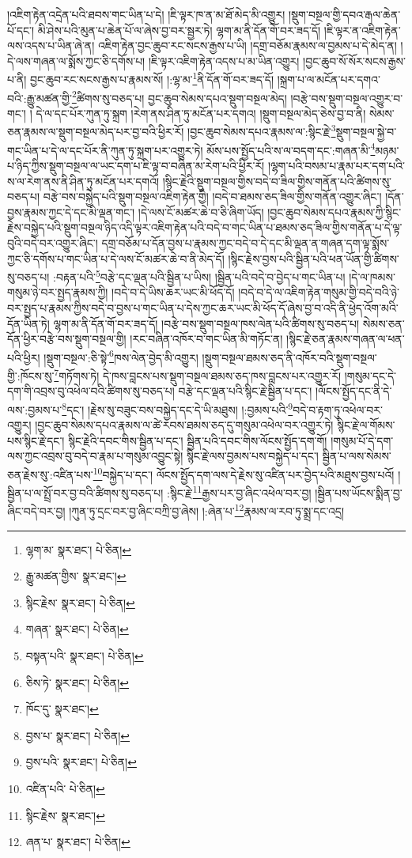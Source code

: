 །འཇིག་རྟེན་འདྲེན་པའི་ཐབས་གང་ཡིན་པ་དེ། །ཇི་ལྟར་ཁ་ན་མ་ཐོ་མེད་མི་འགྱུར། །སྡུག་བསྔལ་གྱི་དབའ་རྒལ་ཆེན་པོ་དང་། མི་ཤེས་པའི་མུན་པ་ཆེན་པོ་ལ་ཞེས་བྱ་བར་སྦྱར་ཏེ། ལྷག་མ་ནི་དོན་གོ་བར་ཟད་དོ། །ཇི་ལྟར་ན་འཇིག་རྟེན་ལས་འདས་པ་ཡིན་ཞེ་ན། འཇིག་རྟེན་བྱང་ཆུབ་རང་སངས་རྒྱས་པ་ཡི། །དགྲ་བཅོམ་རྣམས་ལ་བྱམས་པ་དེ་མེད་ན། །དེ་ལས་གཞན་ལ་སྨོས་ཀྱང་ཅི་དགོས་པ། །ཇི་ལྟར་འཇིག་རྟེན་འདས་པ་མ་ཡིན་འགྱུར། །བྱང་ཆུབ་སོ་སོར་སངས་རྒྱས་པ་ནི། བྱང་ཆུབ་རང་སངས་རྒྱས་པ་རྣམས་སོ། །:ལྷ་མ་\footnote{ལྷག་མ་  སྣར་ཐང་།  པེ་ཅིན། }ནི་དོན་གོ་བར་ཟད་དོ། །སྐྲག་པ་ལ་མངོན་པར་དགའ་བའི་:རྒྱུ་མཚན་གྱི་\footnote{རྒྱུ་མཚན་གྱིས་  སྣར་ཐང་། }ཚིགས་སུ་བཅད་པ། བྱང་ཆུབ་སེམས་དཔའ་སྡུག་བསྔལ་མེད། །བརྩེ་བས་སྡུག་བསྔལ་འགྱུར་བ་གང་། །
དེ་ལ་དང་པོར་ཀུན་ཏུ་སྐྲག །རེག་ནས་ཤིན་ཏུ་མངོན་པར་དགའ། །སྡུག་བསྔལ་མེད་ཅེས་བྱ་བ་ནི། སེམས་ཅན་རྣམས་ལ་སྡུག་བསྔལ་མེད་པར་བྱ་བའི་ཕྱིར་རོ། །བྱང་ཆུབ་སེམས་དཔའ་རྣམས་ལ་:སྙིང་རྗེ་\footnote{སྙིང་རྗེས་  སྣར་ཐང་།  པེ་ཅིན། }སྡུག་བསྔལ་སྐྱེ་བ་གང་ཡིན་པ་དེ་ལ་དང་པོར་ནི་ཀུན་ཏུ་སྐྲག་པར་འགྱུར་ཏེ། མོས་པས་སྤྱོད་པའི་ས་ལ་བདག་དང་:གཞན་མི་\footnote{གཞན་  སྣར་ཐང་།  པེ་ཅིན། }མཉམ་པ་ཉིད་ཀྱིས་སྡུག་བསྔལ་ལ་ཡང་དག་པ་ཇི་ལྟ་བ་བཞིན་མ་རེག་པའི་ཕྱིར་རོ། །ལྷག་པའི་བསམ་པ་རྣམ་པར་དག་པའི་ས་ལ་རེག་ནས་ནི་ཤིན་ཏུ་མངོན་པར་དགའོ། །སྙིང་རྗེའི་སྡུག་བསྔལ་གྱིས་བདེ་བ་ཟིལ་གྱིས་གནོན་པའི་ཚིགས་སུ་བཅད་པ། བརྩེ་བས་བསྐྱེད་པའི་སྡུག་བསྔལ་འཇིག་རྟེན་གྱི། །བདེ་བ་ཐམས་ཅད་ཟིལ་གྱིས་གནོན་འགྱུར་ཞིང་། །དོན་བྱས་རྣམས་ཀྱང་དེ་དང་མི་ལྡན་གང་། །དེ་ལས་ངོ་མཚར་ཆེ་བ་ཅི་ཞིག་ཡོད། །བྱང་ཆུབ་སེམས་དཔའ་རྣམས་ཀྱི་སྙིང་རྗེས་བསྐྱེད་པའི་སྡུག་བསྔལ་ཉིད་འདི་ལྟར་འཇིག་རྟེན་པའི་བདེ་བ་གང་ཡིན་པ་ཐམས་ཅད་ཟིལ་གྱིས་གནོན་པ་དེ་ལྟ་བུའི་བདེ་བར་འགྱུར་ཞིང་། དགྲ་བཅོམ་པ་དོན་བྱས་པ་རྣམས་ཀྱང་བདེ་བ་དེ་དང་མི་ལྡན་ན་གཞན་དག་ལྟ་སྨོས་ཀྱང་ཅི་དགོས་པ་གང་ཡིན་པ་དེ་ལས་ངོ་མཚར་ཆེ་བ་ནི་མེད་དོ། །སྙིང་རྗེས་བྱས་པའི་སྦྱིན་པའི་ཕན་ཡོན་གྱི་ཚིགས་སུ་བཅད་པ། :བརྟན་པའི་\footnote{བསྟན་པའི་  སྣར་ཐང་།  པེ་ཅིན། }བརྩེ་དང་ལྡན་པའི་སྦྱིན་པ་ཡིས། །སྦྱིན་པའི་བདེ་བ་བྱེད་པ་གང་ཡིན་པ། །དེ་ལ་ཁམས་གསུམ་ཉེ་བར་སྤྱད་རྣམས་ཀྱི། །བདེ་བ་དེ་ཡིས་ཆར་ཡང་མི་ཕོད་དོ། །བདེ་བ་དེ་ལ་འཇིག་རྟེན་གསུམ་གྱི་བདེ་བའི་ཉེ་བར་སྤྱད་པ་རྣམས་ཀྱིས་བདེ་བ་བྱས་པ་གང་ཡིན་པ་དེས་ཀྱང་ཆར་ཡང་མི་ཕོད་དོ་ཞེས་བྱ་བ་འདི་ནི་ཕྱེད་འོག་མའི་དོན་ཡིན་ཏེ། ལྷག་མ་ནི་དོན་གོ་བར་ཟད་དོ། །བརྩེ་བས་སྡུག་བསྔལ་ཁས་ལེན་པའི་ཚིགས་སུ་བཅད་པ། སེམས་ཅན་དོན་ཕྱིར་བརྩེ་བས་སྡུག་བསྔལ་གྱི། །རང་བཞིན་འཁོར་བ་གང་ཡིན་མི་གཏོང་ན། །སྙིང་རྗེ་ཅན་རྣམས་གཞན་ལ་ཕན་པའི་ཕྱིར། །སྡུག་བསྔལ་:ཅི་སྟེ་\footnote{ཅིས་ཏེ་  སྣར་ཐང་།  པེ་ཅིན། }ཁས་ལེན་བྱེད་མི་འགྱུར། །སྡུག་བསྔལ་ཐམས་ཅད་ནི་འཁོར་བའི་སྡུག་བསྔལ་གྱི་:ཁོངས་སུ་\footnote{ཁོང་དུ་  སྣར་ཐང་། }གཏོགས་ཏེ། དེ་ཁས་བླངས་པས་སྡུག་བསྔལ་ཐམས་ཅད་ཁས་བླངས་པར་འགྱུར་རོ། །གསུམ་དང་དེ་དག་གི་འབྲས་བུ་འཕེལ་བའི་ཚིགས་སུ་བཅད་པ། བརྩེ་དང་ལྡན་པའི་སྙིང་རྗེ་སྦྱིན་པ་དང་། །ལོངས་སྤྱོད་དང་ནི་དེ་ལས་:བྱམས་པ་\footnote{བྱས་པ་  སྣར་ཐང་།  པེ་ཅིན། }དང་། །རྗེས་སུ་བཟུང་བས་བསྐྱེད་དང་དེ་ཡི་མཐུས། །:བྱམས་པའི་\footnote{བྱས་པའི་  སྣར་ཐང་།  པེ་ཅིན། }བདེ་བ་རྟག་ཏུ་འཕེལ་བར་འགྱུར། །བྱང་ཆུབ་སེམས་དཔའ་རྣམས་ལ་ཚེ་རབས་ཐམས་ཅད་དུ་གསུམ་འཕེལ་བར་འགྱུར་ཏེ། སྙིང་རྗེ་ལ་གོམས་པས་སྙིང་རྗེ་དང་། སྙིང་རྗེའི་དབང་གིས་སྦྱིན་པ་དང་། སྦྱིན་པའི་དབང་གིས་ལོངས་སྤྱོད་དག་གོ། །གསུམ་པོ་དེ་དག་ལས་ཀྱང་འབྲས་བུ་བདེ་བ་རྣམ་པ་གསུམ་འབྱུང་སྟེ། སྙིང་རྗེ་ལས་བྱམས་པས་བསྐྱེད་པ་དང་། སྦྱིན་པ་ལས་སེམས་ཅན་རྗེས་སུ་:འཛིན་པས་\footnote{འཛིན་པའི་  པེ་ཅིན། }བསྐྱེད་པ་དང་། ལོངས་སྤྱོད་དག་ལས་དེ་རྗེས་སུ་འཛིན་པར་བྱེད་པའི་མཐུས་བྱས་པའོ། །སྦྱིན་པ་ལ་སྤྲོ་བར་བྱ་བའི་ཚིགས་སུ་བཅད་པ། :སྙིང་རྗེ་\footnote{སྙིང་རྗེས་  སྣར་ཐང་། }རྒྱས་པར་བྱ་ཞིང་འཕེལ་བར་བྱ། །སྦྱིན་པས་ཡོངས་སྨིན་བྱ་ཞིང་བདེ་བར་བྱ། །ཀུན་ཏུ་དྲང་བར་བྱ་ཞིང་བཀྲི་བྱ་ཞེས། །:ཞེན་པ་\footnote{ཞན་པ་  སྣར་ཐང་།  པེ་ཅིན། }རྣམས་ལ་རབ་ཏུ་སྨྲ་དང་འདྲ། 